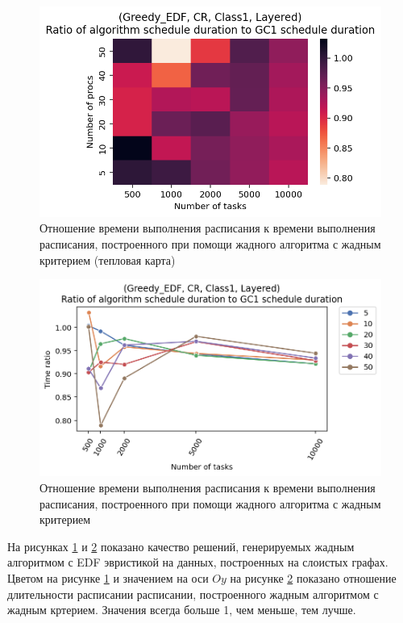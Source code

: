 \begin{figure}
    \centering
    \includegraphics[width=\textwidth]{imgs/layered_class_1/CR_EDF/times.png}
    \caption{Отношение времени выполнения расписания к времени выполнения расписания, построенного при помощи жадного алгоритма с жадным критерием (тепловая карта)}
    \label{fig:CR-layered-EDF-times-heatmap}
\end{figure}

\begin{figure}[!htbp]
    \centering
    \includegraphics[width=\textwidth]{imgs/layered_class_1/CR_EDF/gr_amalgamated.png}
    \caption{Отношение времени выполнения расписания к времени выполнения расписания, построенного при помощи жадного алгоритма с жадным критерием}
    \label{fig:CR-layered-EDF-times-compiled}
\end{figure}

На рисунках \ref{fig:CR-layered-EDF-times-heatmap} и \ref{fig:CR-layered-EDF-times-compiled} показано качество решений, генерируемых жадным алгоритмом с EDF эвристикой на данных, построенных на слоистых графах. Цветом на рисунке \ref{fig:CR-layered-EDF-times-heatmap} и значением на оси $Oy$ на рисунке \ref{fig:CR-layered-EDF-times-compiled} показано отношение длительности расписании расписании, построенного жадным алгоритмом с жадным кртерием. Значения всегда больше 1, чем меньше, тем лучше.

